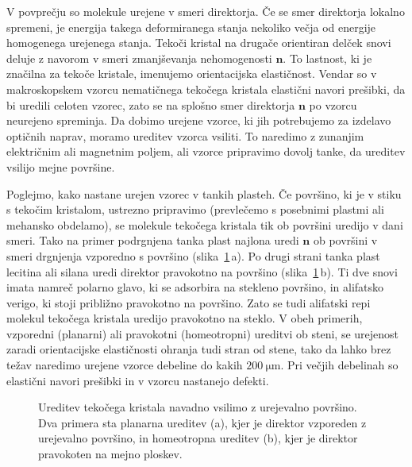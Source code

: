V povprečju so molekule urejene v smeri direktorja. Če se smer direktorja lokalno
spremeni, je energija takega deformiranega 
stanja nekoliko večja od energije homogenega urejenega stanja. Tekoči kristal na
drugače orientiran delček snovi deluje z navorom v smeri zmanjševanja 
nehomogenosti $\mathbf{n}$. To lastnost, ki je značilna za tekoče kristale,
imenujemo orientacijska elastičnost. Vendar so v makroskopskem vzorcu
nematičnega tekočega kristala elastični navori prešibki,
da bi uredili celoten vzorec, zato se na splošno smer direktorja $\mathbf{n}$ 
po vzorcu neurejeno spreminja. Da dobimo urejene vzorce, ki jih potrebujemo za izdelavo
optičnih naprav, moramo ureditev vzorca 
vsiliti. To naredimo z zunanjim električnim ali magnetnim poljem, 
ali vzorce pripravimo dovolj tanke, da ureditev vsilijo mejne površine. 

Poglejmo, kako nastane urejen vzorec v tankih plasteh. Če površino,
ki je v stiku s tekočim kristalom, ustrezno pripravimo (prevlečemo s posebnimi 
plastmi ali mehansko obdelamo), se molekule tekočega kristala tik ob površini uredijo
v dani smeri. Tako na primer podrgnjena tanka plast najlona uredi
$\mathbf{n}$ ob površini v smeri drgnjenja vzporedno s površino (slika~\ref{s7.20a}\,a). 
Po drugi strani tanka plast lecitina ali silana uredi direktor 
pravokotno na površino (slika~\ref{s7.20a}\,b). Ti dve snovi imata namreč
polarno glavo, ki se adsorbira na stekleno površino, in alifatsko verigo, 
ki stoji približno pravokotno na površino. Zato se tudi alifatski repi molekul
tekočega kristala uredijo pravokotno na steklo. V obeh primerih, 
vzporedni (planarni) ali pravokotni (homeotropni) ureditvi ob steni, 
se urejenost zaradi orientacijske elastičnosti
ohranja tudi stran od stene, tako da lahko brez težav naredimo urejene
vzorce debeline do kakih $200~\si{\micro\metre}$. Pri večjih debelinah so elastični
navori prešibki in v vzorcu nastanejo defekti.
\begin{figure}[h]
\centering 
\def\svgwidth{120truemm} 

\caption{Ureditev tekočega kristala navadno vsilimo z urejevalno površino. Dva primera
sta planarna ureditev (a), kjer je direktor vzporeden z urejevalno površino, in 
homeotropna ureditev (b), kjer je direktor pravokoten na mejno ploskev.}
\label{s7.20a}
\end{figure}
 
